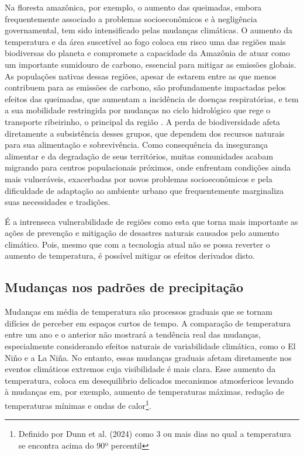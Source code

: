 Na floresta amazônica, por exemplo, o aumento das queimadas, embora frequentemente associado a problemas socioeconômicos
e à negligência governamental, tem sido intensificado pelas mudanças climáticas. O aumento da temperatura e da área
suscetível ao fogo coloca em risco uma das regiões mais biodiversas do planeta e compromete a capacidade da Amazônia de
atuar como um importante sumidouro de carbono, essencial para mitigar as emissões globais. As populações nativas dessas
regiões, apesar de estarem entre as que menos contribuem para as emissões de carbono, são profundamente impactadas pelos
efeitos das queimadas, que aumentam a incidência de doenças respiratórias, e tem a sua mobilidade restringida por
mudanças no ciclo hidrológico que rege o transporte ribeirinho, o principal da região \cite{pinho}. A perda de
biodiversidade afeta diretamente a subsistência desses grupos, que dependem dos recursos naturais para sua alimentação e
sobrevivência. Como consequência da insegurança alimentar e da degradação de seus territórios, muitas comunidades acabam
migrando para centros populacionais próximos, onde enfrentam condições ainda mais vulneráveis, exacerbadas por novos
problemas socioeconômicos e pela dificuldade de adaptação ao ambiente urbano que frequentemente marginaliza suas
necessidades e tradições.

É a intrenseca vulnerabilidade de regiões como esta que torna mais importante as ações de prevenção e mitigação de
desastres naturais causados pelo aumento climático. Pois, mesmo que com a tecnologia atual não se possa reverter o
aumento de temperatura, é possível mitigar os efeitos derivados disto.


\subsection{Mudanças nos padrões de precipitação}
\label{rain}
Mudanças em média de temperatura são processos graduais que se tornam difícies de perceber em espaços curtos de tempo. A
comparação de temperatura entre um ano e o anterior não mostrará a tendência real das mudanças, especialmente
considerando efeitos naturais de variabilidade climática, como o El Niño e a La Niña. No entanto, essas mudanças
graduais afetam diretamente nos eventos climáticos extremos cuja visibilidade é mais clara. Esse aumento da temperatura,
coloca em desequilibrio delicados mecanismos atmosfericos levando à mudanças em, por exemplo, aumento de temperaturas
máximas, redução de temperaturas mínimas e ondas de calor\footnote{Definido por Dunn et al. (2024) \cite{dunn} como 3 ou
mais dias no qual a temperatura se encontra acima do 90º percentil}.

